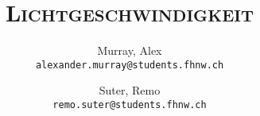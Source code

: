 \author{%
    Murray, Alex\\
    \texttt{alexander.murray@students.fhnw.ch}
    \and
    Suter, Remo\\
    \texttt{remo.suter@students.fhnw.ch}
}

\title{
    \vspace{20mm}
    \Huge{\textsc{Lichtgeschwindigkeit}}
}
